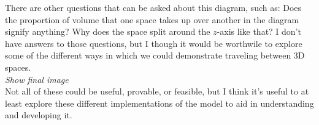 \documentclass[20pt]{article} %
\begin{document}
There are other questions that can be asked about this diagram, such as: Does the proportion of volume that one space takes up over another in the diagram signify anything? Why does the space split around the $z$-axis like that? I don't have answers to those questions, but I though it would be worthwile to explore some of the different ways in which we could demonstrate traveling between 3D spaces. \\ 

\textit{ Show final image} \\ 


Not all of these could be useful, provable, or feasible, but I think it's useful to at least explore these different implementations of the model to aid in understanding and developing it.
\end{document}
